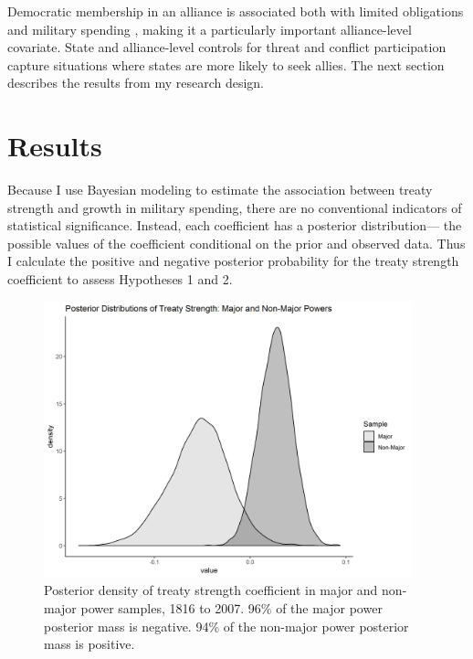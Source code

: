 \documentclass[12pt]{article}
\begin{document}
Democratic membership in an alliance is associated both with limited obligations \citep{Chibaetal2015} and military spending \citep{DigiuseppePoast2016}, making it a particularly important alliance-level covariate.  
State and alliance-level controls for threat and conflict participation capture situations where states are more likely to seek allies. 
The next section describes the results from my research design. 

\section{Results}

Because I use Bayesian modeling to estimate the association between treaty strength and growth in military spending, there are no conventional indicators of statistical significance. 
Instead, each coefficient has a posterior distribution--- the possible values of the coefficient conditional on the prior and observed data. 
Thus I calculate the positive and negative posterior probability for the treaty strength coefficient to assess Hypotheses 1 and 2.


\begin{figure}[htbp]
	\centering
		\includegraphics[width=0.95\textwidth]{../figures/str-dens.png}
	\caption{Posterior density of treaty strength coefficient in major and non-major power samples, 1816 to 2007. 96\% of the major power posterior mass is negative. 94\% of the non-major power posterior mass is positive.}
	\label{fig:str-dens}
\end{figure}
\end{document}
